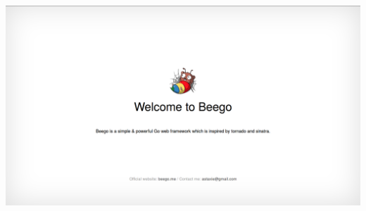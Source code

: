 \documentclass[12pt]{article}
\begin{document}
\includegraphics[scale=0.25]{beego.png}
\end{document}
